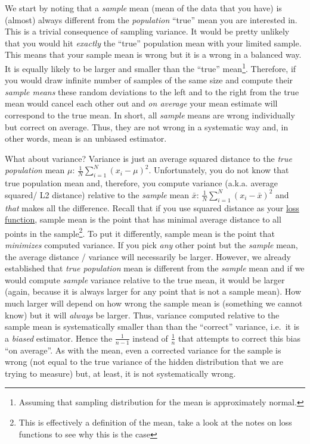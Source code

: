 \documentclass[
]{book}
\begin{document}
We start by noting that a \emph{sample} mean (mean of the data that you have) is (almost) always different from the \emph{population} ``true'' mean you are interested in. This is a trivial consequence of sampling variance. It would be pretty unlikely that you would hit \emph{exactly} the ``true'' population mean with your limited sample. This means that your sample mean is wrong but it is a wrong in a balanced way. It is equally likely to be larger and smaller than the ``true'' mean\footnote{Assuming that sampling distribution for the mean is approximately normal.}. Therefore, if you would draw infinite number of samples of the same size and compute their \emph{sample means} these random deviations to the left and to the right from the true mean would cancel each other out and \emph{on average} your mean estimate will correspond to the true mean. In short, all \emph{sample} means are wrong individually but correct on average. Thus, they are not wrong in a systematic way and, in other words, mean is an unbiased estimator.

What about variance? Variance is just an average squared distance to the \emph{true population} mean \(\mu\): \(\frac{1}{N}\sum\limits^{N}_{i=1}{(x_i-\mu)^2}\). Unfortunately, you do not know that true population mean and, therefore, you compute variance (a.k.a. average squared/ L2 distance) relative to the \emph{sample} mean \(\bar{x}\): \(\frac{1}{N}\sum\limits^{N}_{i=1}{(x_i-\bar{x})^2}\) and \emph{that} makes all the difference. Recall that if you use squared distance as your \protect\hyperlink{loss-functions}{loss function}, sample mean is the point that has minimal average distance to all points in the sample\footnote{This is effectively a definition of the mean, take a look at the notes on loss functions to see why this is the case}. To put it differently, sample mean is the point that \emph{minimizes} computed variance. If you pick \emph{any} other point but the \emph{sample} mean, the average distance / variance will necessarily be larger. However, we already established that \emph{true population} mean is different from the \emph{sample} mean and if we would compute \emph{sample} variance relative to the true mean, it would be larger (again, because it is always larger for any point that is not a sample mean). How much larger will depend on how wrong the sample mean is (something we cannot know) but it will \emph{always} be larger. Thus, variance computed relative to the sample mean is systematically smaller than than the ``correct'' variance, i.e.~it is a \emph{biased} estimator. Hence the \(\frac{1}{n-1}\) instead of \(\frac{1}{n}\) that attempts to correct this bias ``on average''. As with the mean, even a corrected variance for the sample is wrong (not equal to the true variance of the hidden distribution that we are trying to measure) but, at least, it is not systematically wrong.
\end{document}
